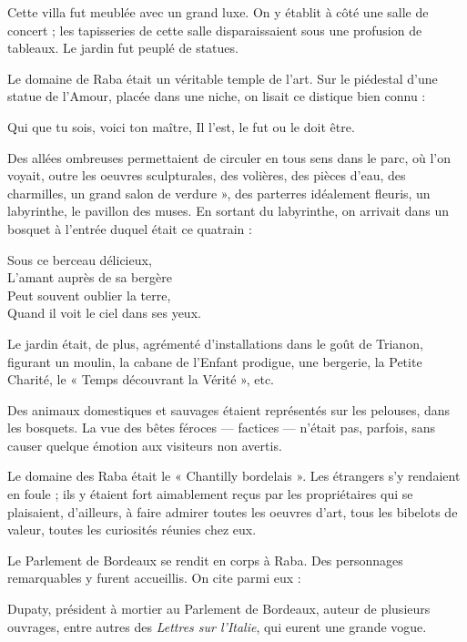 Cette villa fut meublée avec un grand luxe. On y établit à côté une salle de concert ; les tapisseries de cette salle disparaissaient sous une profusion de tableaux. Le jardin fut peuplé de statues.

Le domaine de Raba était un véritable temple de l'art. Sur le piédestal d'une statue de l'Amour, placée dans une niche, on lisait ce distique bien connu : 

\begin{center}
Qui que tu sois, voici ton maître, Il l'est, le fut ou le doit être.
\end{center}

Des allées ombreuses permettaient de circuler en tous sens dans le parc, où l'on voyait, outre les oeuvres sculpturales, des volières, des pièces d'eau, des charmilles, un grand salon de verdure », des parterres idéalement fleuris, un labyrinthe, le pavillon des muses. En sortant du labyrinthe, on arrivait dans un bosquet à l'entrée duquel était ce quatrain : 


\begin{center}
Sous ce berceau délicieux,\\
L'amant auprès de sa bergère\\
Peut souvent oublier la terre,\\
Quand il voit le ciel dans ses yeux.
\end{center}

Le jardin était, de plus, agrémenté d'installations dans le goût de Trianon, figurant un moulin, la cabane de l'Enfant prodigue, une bergerie, la Petite Charité, le « Temps découvrant la Vérité », etc.

Des animaux domestiques et sauvages étaient représentés sur les pelouses, dans les bosquets. La vue des bêtes féroces — factices — n'était pas, parfois, sans causer quelque émotion aux visiteurs non avertis.

Le domaine des Raba était le « Chantilly bordelais ». Les étrangers s'y rendaient en foule ; ils y étaient fort aimablement reçus par les propriétaires qui se plaisaient, d'ailleurs, à faire admirer toutes les oeuvres d'art, tous les bibelots de valeur, toutes les curiosités réunies chez eux.

Le Parlement de Bordeaux se rendit en corps à Raba. Des personnages remarquables y furent accueillis. On cite parmi eux :

Dupaty, président à mortier au Parlement de Bordeaux, auteur de plusieurs ouvrages, entre autres des \textit{Lettres sur l'Italie}, qui eurent une grande vogue.

